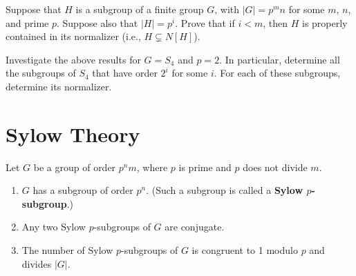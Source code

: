\begin{problem}\label{prob:hpropinnorm}
Suppose that $H$ is a subgroup of a finite group $G$, with $|G| = p^m n$ for some $m$, $n$, and prime $p$. Suppose also that $\lvert H \rvert = p^i$. Prove that if $i<m$, then $H$ is properly contained in its normalizer (i.e., $H \subsetneq N[H]$).
\end{problem}

\begin{problem}\label{prob:s4subgroups2}
Investigate the above results for $G = S_4$ and $p = 2$.  In particular, determine all the subgroups of $S_4$ that have order $2^i$ for some $i$.  For each of these subgroups, determine its normalizer.
\begin{annotation}
\end{annotation}
\end{problem}


\section{Sylow Theory}\label{sec:sylow}

\begin{theorem}\label{thm:sylow}
 Let $G$ be a group of order $p^nm$, where $p$ is prime and $p$ does not divide $m$.
\begin{annotation}
\end{annotation}
 \begin{enumerate}
  \item $G$ has a subgroup of order $p^n$. (Such a subgroup is called a \textbf{Sylow $p$-subgroup}.)
  \item Any two Sylow $p$-subgroups of $G$ are conjugate.
\begin{annotation}
\end{annotation}
  \item The number of Sylow $p$-subgroups of $G$ is congruent to 1 modulo $p$ and divides $\lvert G \rvert$.
 \end{enumerate}
\end{theorem}

